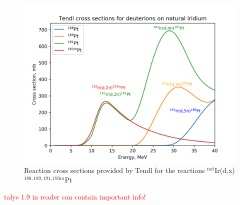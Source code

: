 \begin{figure}
    \centering
    \includegraphics{Theory/reactionchannels_pt.png}
    \caption{Reaction cross sections provided by Tendl for the reactions $^\text{nat}$Ir(d,x)$^{188,189,191,193m}$Pt}
    \label{fig:pt_reactionchannels}
\end{figure}

\textcolor{red}{talys 1.9 in reader can contain important info!}




